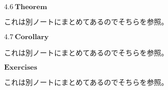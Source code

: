 \documentclass[9pt,fleqn]{jarticle}
\begin{document}
%
%
%
%
%
%

\nl
$\bm{4.6\ Theorem}$
\nl

これは別ノートにまとめてあるのでそちらを参照。

\nl
$\bm{4.7\ Corollary}$
\nl

これは別ノートにまとめてあるのでそちらを参照。

\nl
$\bm{Exercises}$

これは別ノートにまとめてあるのでそちらを参照。
\end{document}
